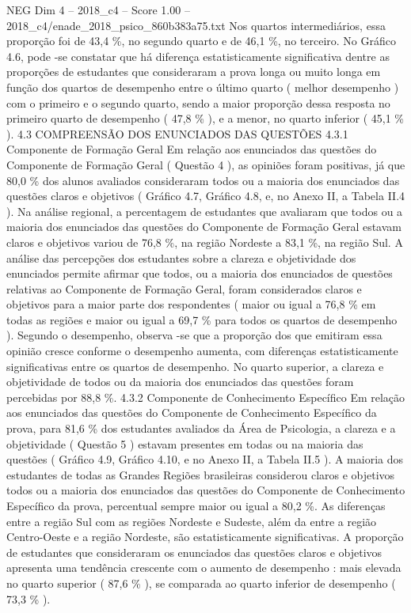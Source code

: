 \begin{textsample}{NEG Dim 4 – 2018\_c4 – Score 1.00 – 2018\_c4/enade\_2018\_psico\_860b383a75.txt}
Nos quartos intermediários, essa proporção foi de 43,4 \%, no segundo quarto e de 46,1 \%, no terceiro.
No Gráfico 4.6, pode -se constatar que há diferença estatisticamente significativa dentre as proporções de estudantes que consideraram a prova longa ou muito longa em função dos quartos de desempenho entre o último quarto ( melhor desempenho ) com o primeiro e o segundo quarto, sendo a maior proporção dessa resposta no primeiro quarto de desempenho ( 47,8 \% ), e a menor, no quarto inferior ( 45,1 \% ). 4.3 COMPREENSÃO DOS ENUNCIADOS DAS QUESTÕES 4.3.1 Componente de Formação Geral Em relação aos enunciados das questões do Componente de Formação Geral ( Questão 4 ), as opiniões foram positivas, já que 80,0 \% dos alunos avaliados consideraram todos ou a maioria dos enunciados das questões claros e objetivos ( Gráfico 4.7, Gráfico 4.8, e, no Anexo II, a Tabela II.4 ).
Na análise regional, a percentagem de estudantes que avaliaram que todos ou a maioria dos enunciados das questões do Componente de Formação Geral estavam claros e objetivos variou de 76,8 \%, na região Nordeste a 83,1 \%, na região Sul.
A análise das percepções dos estudantes sobre a clareza e objetividade dos enunciados permite afirmar que todos, ou a maioria dos enunciados de questões relativas ao Componente de Formação Geral, foram considerados claros e objetivos para a maior parte dos respondentes ( maior ou igual a 76,8 \% em todas as regiões e maior ou igual a 69,7 \% para todos os quartos de desempenho ).
Segundo o desempenho, observa -se que a proporção dos que emitiram essa opinião cresce conforme o desempenho aumenta, com diferenças estatisticamente significativas entre os quartos de desempenho.
No quarto superior, a clareza e objetividade de todos ou da maioria dos enunciados das questões foram percebidas por 88,8 \%. 4.3.2 Componente de Conhecimento Específico Em relação aos enunciados das questões do Componente de Conhecimento Específico da prova, para 81,6 \% dos estudantes avaliados da Área de Psicologia, a clareza e a objetividade ( Questão 5 ) estavam presentes em todas ou na maioria das questões ( Gráfico 4.9, Gráfico 4.10, e no Anexo II, a Tabela II.5 ).
A maioria dos estudantes de todas as Grandes Regiões brasileiras considerou claros e objetivos todos ou a maioria dos enunciados das questões do Componente de Conhecimento Específico da prova, percentual sempre maior ou igual a 80,2 \%.
As diferenças entre a região Sul com as regiões Nordeste e Sudeste, além da entre a região Centro-Oeste e a região Nordeste, são estatisticamente significativas.
A proporção de estudantes que consideraram os enunciados das questões claros e objetivos apresenta uma tendência crescente com o aumento de desempenho : mais elevada no quarto superior ( 87,6 \% ), se comparada ao quarto inferior de desempenho ( 73,3 \% ).

\end{textsample}
